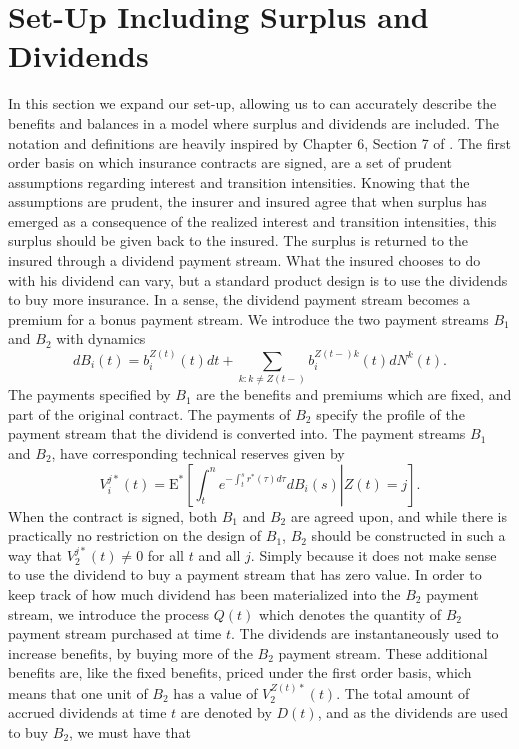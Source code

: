 \documentclass[12pt]{article}
\newcommand{\E}{\text{E}}
\theoremstyle{my_thm}
\begin{document}
\section{Set-Up Including Surplus and Dividends} \label{sec:Set_2}
In this section we expand our set-up, allowing us to can accurately describe the benefits and balances in a model where surplus and dividends are included. The notation and definitions are heavily inspired by Chapter 6, Section 7 of \citet{RaI}. The first order basis on which insurance contracts are signed, are a set of prudent assumptions regarding interest and transition intensities. Knowing that the assumptions are prudent, the insurer and insured agree that when surplus has emerged as a consequence of the realized interest and transition intensities, this surplus should be given back to the insured. The surplus is returned to the insured through a dividend payment stream. What the insured chooses to do with his dividend can vary, but a standard product design is to use the dividends to buy more insurance. In a sense, the dividend payment stream becomes a premium for a bonus payment stream. We introduce the two payment streams $B_1$ and $B_2$ with dynamics
$$
dB_i(t)=b_i^{Z(t)}(t) dt +\sum_{k:k \neq Z(t-)} b_i^{Z(t-)k}(t)dN^k(t).
$$
The payments specified by $B_1$ are the benefits and premiums which are fixed, and part of the original contract. The payments of $B_2$ specify the profile of the payment stream that the dividend is converted into. The payment streams $B_1$ and $B_2$, have corresponding technical reserves given by
$$
V_i^{j*}(t)=\E^* \left. \left[ \int_t^n e^{-\int_t^s r^*(\tau) d\tau} dB_i(s) \right| Z(t)=j \right].
$$
When the contract is signed, both $B_1$ and $B_2$ are agreed upon, and while there is practically no restriction on the design of $B_1$, $B_2$ should be constructed in such a way that $V_2^{j*}(t)\neq 0$ for all $t$ and all $j$. Simply because it does not make sense to use the dividend to buy a payment stream that has zero value. In order to keep track of how much dividend has been materialized into the $B_2$ payment stream, we introduce the process $Q(t)$ which denotes the quantity of $B_2$ payment stream purchased at time $t$. The dividends are instantaneously used to increase benefits, by buying more of the $B_2$ payment stream. These additional benefits are, like the fixed benefits, priced under the first order basis, which means that one unit of $B_2$ has a value of $V_2^{Z(t)*}(t)$. The total amount of accrued dividends at time $t$ are denoted by $D(t)$, and as the dividends are used to buy $B_2$, we must have that
\end{document}

